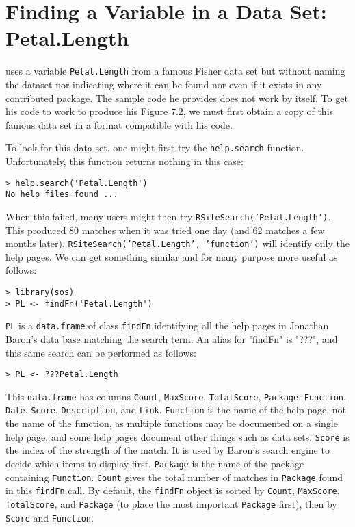 \section*{Finding a Variable in a Data Set:  Petal.Length}

\cite[pp. 282-283]{JC09} uses a variable {\tt Petal.Length} from a
famous Fisher data set but without naming the dataset nor indicating
where it can be found nor even if it exists in any contributed \R{}
package.  The sample code he provides does not work by itself.  To get
his code to  work to produce his Figure 7.2, we must first obtain a
copy of this famous data set in a format compatible with his code.

To look for this data set, one might first try
the {\tt help.search} function.  Unfortunately, this function
returns nothing in this case:
\begin{verbatim}
> help.search('Petal.Length')
No help files found ...
\end{verbatim}
When this failed, many users might then try
{\tt RSiteSearch('Petal.Length')}.  This produced 80 matches
when it was tried one day (and 62 matches a few months later).
{\tt RSiteSearch('Petal.Length', 'function')} will identify
only the help pages.  We can get something similar and for
many purpose more useful as follows:
\begin{verbatim}
> library(sos)
> PL <- findFn('Petal.Length')
\end{verbatim}
{\tt PL} is a {\tt data.frame} of class {\tt findFn} identifying
all the help pages in Jonathan Baron's data base matching the
search term.  An alias for "findFn" is "???", and this same
search can be performed as follows:
\begin{verbatim}
> PL <- ???Petal.Length
\end{verbatim}
This {\tt data.frame} has columns {\tt Count},
{\tt MaxScore}, {\tt TotalScore}, {\tt Package}, {\tt Function},
{\tt Date}, {\tt Score}, {\tt Description}, and {\tt Link}.
{\tt Function} is the name of the help page, not the name of the
function, as multiple functions may be documented on a single
help page, and some help pages document other things such as data
sets.  {\tt Score} is the index of the strength of the match.  It is used
by Baron's search engine to decide which items to display first.
{\tt Package} is the name of the package containing {\tt Function}.
{\tt Count} gives the total number of matches in {\tt Package} found in this
{\tt findFn} call.  By default, the {\tt findFn} object is sorted by {\tt Count}, {\tt MaxScore}, {\tt TotalScore},
and {\tt Package} (to place the most important {\tt Package}
first), then by {\tt Score} and {\tt Function}.

